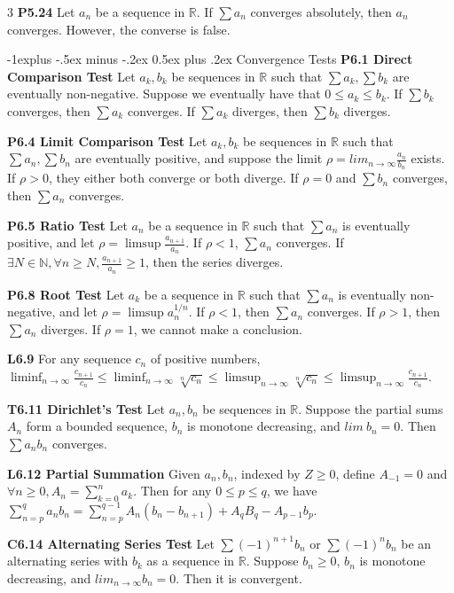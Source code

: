 \documentclass[10pt, landscape]{article}
\makeatletter
\renewcommand{\section}{\@startsection{section}{1}{0mm}%
                                {-1ex plus -.5ex minus -.2ex}%
                                {0.5ex plus .2ex}%
                                {\normalfont\large\bfseries}}
\renewcommand{\section}{\@startsection{section}{2}{0mm}%
                                {-1explus -.5ex minus -.2ex}%
                                {0.5ex plus .2ex}%
                                {\normalfont\normalsize\bfseries}}
\makeatother
\begin{document}
\begin{multicols*}{3}
\textbf{P5.24} Let $a_n$ be a sequence in $\mathbb{R}$. If $\sum a_n$ converges absolutely, then $a_n$ converges. However, the converse is false.

\section{Convergence Tests}
\textbf{P6.1 Direct Comparison Test} Let $a_k, b_k$ be sequences in $\mathbb{R}$ such that $\sum a_k, \sum b_k$ are eventually non-negative. Suppose we eventually have that $0 \leq a_k \leq b_k$. If $\sum b_k$ converges, then $\sum a_k$ converges. If $\sum a_k$ diverges, then $\sum b_k$ diverges.

\textbf{P6.4 Limit Comparison Test} Let $a_k, b_k$ be sequences in $\mathbb{R}$ such that $\sum a_n, \sum b_n$ are eventually positive, and suppose the limit $\rho=lim_{n \rightarrow \infty}\frac{a_n}{b_n}$ exists. If $\rho > 0$, they either both converge or both diverge. If $\rho = 0$ and $\sum b_n$ converges, then $\sum a_n$ converges.

\textbf{P6.5 Ratio Test} Let $a_n$ be a sequence in $\mathbb{R}$ such that $\sum a_n$ is eventually positive, and let $\rho=\limsup \frac{a_{n+1}}{a_n}$. If $\rho<1$, $\sum a_n$ converges. If $\exists N \in \mathbb{N}, \forall n \geq N, \frac{a_{n+1}}{a_n}\geq 1$, then the series diverges.

\textbf{P6.8 Root Test} Let $a_k$ be a sequence in $\mathbb{R}$ such that $\sum a_n$ is eventually non-negative, and let $\rho=\limsup a_n^{1/n}$. If $\rho < 1$, then $\sum a_n$ converges. If $\rho > 1$, then $\sum a_n$ diverges. If $\rho=1$, we cannot make a conclusion.

\textbf{L6.9} For any sequence $c_n$ of positive numbers, $\liminf_{n \rightarrow \infty}\frac{c_{n+1}}{c_n}\leq \liminf_{n \rightarrow \infty}\sqrt[n]{c_n} \leq \limsup_{n \rightarrow\infty} \sqrt[n]{c_n}\leq \limsup_{n \rightarrow \infty}\frac{c_{n+1}}{c_n}$.

\textbf{T6.11 Dirichlet's Test} Let $a_n, b_n$ be sequences in $\mathbb{R}$. Suppose the partial sums $A_n$ form a bounded sequence, $b_n$ is monotone decreasing, and $lim\ b_n=0$. Then $\sum a_nb_n$ converges.

\textbf{L6.12 Partial Summation} Given $a_n, b_n$, indexed by $Z \geq 0$, define $A_{-1}=0$ and $\forall n \geq 0, A_n=\sum_{k=0}^n a_k$. Then for any $0\leq p \leq q$, we have $\sum_{n=p}^qa_nb_n=\sum_{n=p}^{q-1} A_n(b_n-b_{n+1})+A_qB_q-A_{p-1}b_p$.

\textbf{C6.14 Alternating Series Test} Let $\sum (-1)^{n+1} b_n$ or $\sum (-1)^nb_n$ be an alternating series with $b_k$ as a sequence in $\mathbb{R}$. Suppose $b_n \geq 0$, $b_n$ is monotone decreasing, and $lim_{n\rightarrow\infty} b_n=0$. Then it is convergent.


\end{multicols*}
\end{document}
